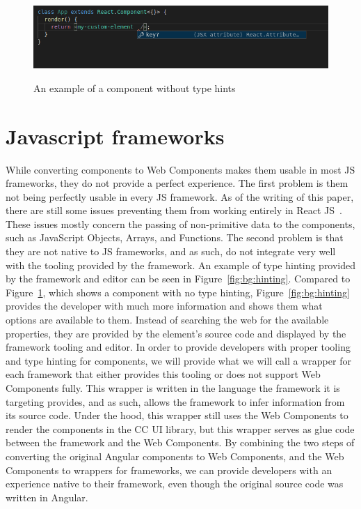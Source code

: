 \begin{figure}[h]
  \caption{An example of a component without type hints}
  \includegraphics[width=\columnwidth]{figures/background/no-hinting.png}
  \label{fig:bg:no-hinting}
  \centering
\end{figure}

\section{Javascript frameworks}\label{sec:bg:jsframeworks}
While converting components to Web Components makes them usable in most JS frameworks, they do not provide a perfect experience. The first problem is them not being perfectly usable in every JS framework. As of the writing of this paper, there are still some issues preventing them from working entirely in React JS~. These issues mostly concern the passing of non-primitive data to the components, such as JavaScript Objects, Arrays, and Functions. The second problem is that they are not native to JS frameworks, and as such, do not integrate very well with the tooling provided by the framework. An example of type hinting provided by the framework and editor can be seen in Figure~\ref{fig:bg:hinting}. Compared to Figure~\ref{fig:bg:no-hinting}, which shows a component with no type hinting, Figure~\ref{fig:bg:hinting} provides the developer with much more information and shows them what options are available to them. Instead of searching the web for the available properties, they are provided by the element's source code and displayed by the framework tooling and editor. In order to provide developers with proper tooling and type hinting for components, we will provide what we will call a wrapper for each framework that either provides this tooling or does not support Web Components fully. This wrapper is written in the language the framework it is targeting provides, and as such, allows the framework to infer information from its source code. Under the hood, this wrapper still uses the Web Components to render the components in the CC UI library, but this wrapper serves as glue code between the framework and the Web Components. By combining the two steps of converting the original Angular components to Web Components, and the Web Components to wrappers for frameworks, we can provide developers with an experience native to their framework, even though the original source code was written in Angular.